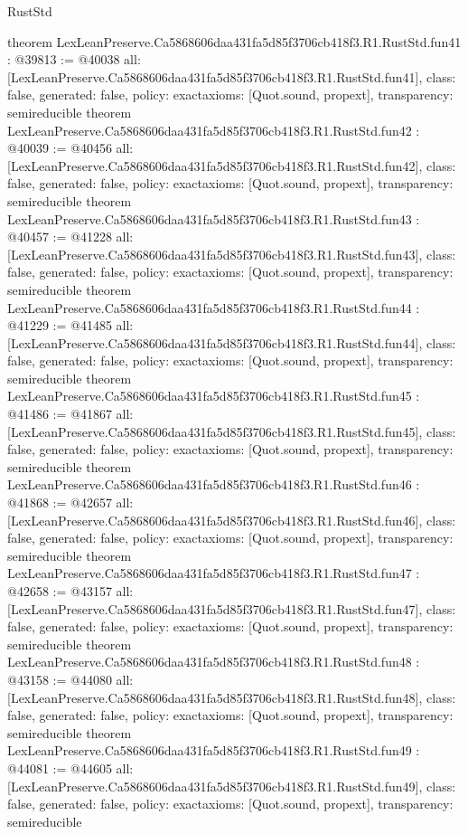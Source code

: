 \begin{lexlean}{RustStd}
\begin{coremodule}
{}
theorem LexLeanPreserve.Ca5868606daa431fa5d85f3706cb418f3.R1.RustStd.fun41 : @39813 := @40038 {
  all: [LexLeanPreserve.Ca5868606daa431fa5d85f3706cb418f3.R1.RustStd.fun41],
  class: false,
  generated: false,
  policy: exact{axioms: [Quot.sound, propext]},
  transparency: semireducible
}
theorem LexLeanPreserve.Ca5868606daa431fa5d85f3706cb418f3.R1.RustStd.fun42 : @40039 := @40456 {
  all: [LexLeanPreserve.Ca5868606daa431fa5d85f3706cb418f3.R1.RustStd.fun42],
  class: false,
  generated: false,
  policy: exact{axioms: [Quot.sound, propext]},
  transparency: semireducible
}
theorem LexLeanPreserve.Ca5868606daa431fa5d85f3706cb418f3.R1.RustStd.fun43 : @40457 := @41228 {
  all: [LexLeanPreserve.Ca5868606daa431fa5d85f3706cb418f3.R1.RustStd.fun43],
  class: false,
  generated: false,
  policy: exact{axioms: [Quot.sound, propext]},
  transparency: semireducible
}
theorem LexLeanPreserve.Ca5868606daa431fa5d85f3706cb418f3.R1.RustStd.fun44 : @41229 := @41485 {
  all: [LexLeanPreserve.Ca5868606daa431fa5d85f3706cb418f3.R1.RustStd.fun44],
  class: false,
  generated: false,
  policy: exact{axioms: [Quot.sound, propext]},
  transparency: semireducible
}
theorem LexLeanPreserve.Ca5868606daa431fa5d85f3706cb418f3.R1.RustStd.fun45 : @41486 := @41867 {
  all: [LexLeanPreserve.Ca5868606daa431fa5d85f3706cb418f3.R1.RustStd.fun45],
  class: false,
  generated: false,
  policy: exact{axioms: [Quot.sound, propext]},
  transparency: semireducible
}
theorem LexLeanPreserve.Ca5868606daa431fa5d85f3706cb418f3.R1.RustStd.fun46 : @41868 := @42657 {
  all: [LexLeanPreserve.Ca5868606daa431fa5d85f3706cb418f3.R1.RustStd.fun46],
  class: false,
  generated: false,
  policy: exact{axioms: [Quot.sound, propext]},
  transparency: semireducible
}
theorem LexLeanPreserve.Ca5868606daa431fa5d85f3706cb418f3.R1.RustStd.fun47 : @42658 := @43157 {
  all: [LexLeanPreserve.Ca5868606daa431fa5d85f3706cb418f3.R1.RustStd.fun47],
  class: false,
  generated: false,
  policy: exact{axioms: [Quot.sound, propext]},
  transparency: semireducible
}
theorem LexLeanPreserve.Ca5868606daa431fa5d85f3706cb418f3.R1.RustStd.fun48 : @43158 := @44080 {
  all: [LexLeanPreserve.Ca5868606daa431fa5d85f3706cb418f3.R1.RustStd.fun48],
  class: false,
  generated: false,
  policy: exact{axioms: [Quot.sound, propext]},
  transparency: semireducible
}
theorem LexLeanPreserve.Ca5868606daa431fa5d85f3706cb418f3.R1.RustStd.fun49 : @44081 := @44605 {
  all: [LexLeanPreserve.Ca5868606daa431fa5d85f3706cb418f3.R1.RustStd.fun49],
  class: false,
  generated: false,
  policy: exact{axioms: [Quot.sound, propext]},
  transparency: semireducible
}
\end{coremodule}
\end{lexlean}
